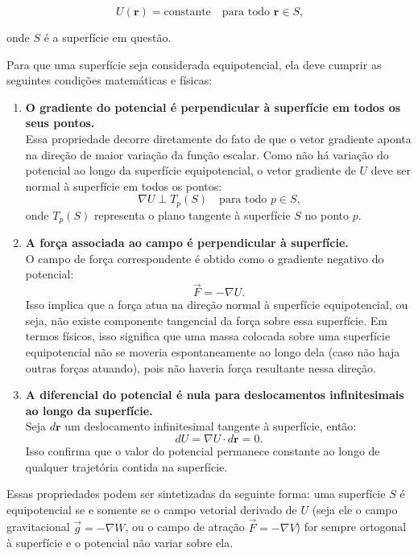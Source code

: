\[
U(\mathbf{r}) = \text{constante} \quad \text{para todo } \mathbf{r} \in S \text{,}
\]

\noindent
onde \( S \) é a superfície em questão.

Para que uma superfície seja considerada equipotencial, ela deve cumprir as seguintes condições matemáticas e físicas:

\begin{enumerate}
   \item \textbf{O gradiente do potencial é perpendicular à superfície em todos os seus pontos.} \\
   Essa propriedade decorre diretamente do fato de que o vetor gradiente aponta na direção de maior variação da função escalar. Como não há variação do potencial ao longo da superfície equipotencial, o vetor gradiente de \( U \) deve ser normal à superfície em todos os pontos:
   \[
   \nabla U \perp T_p(S) \quad \text{para todo } p \in S \text{,}
   \]
   onde \( T_p(S) \) representa o plano tangente à superfície \( S \) no ponto \( p \).

   \item \textbf{A força associada ao campo é perpendicular à superfície.} \\
   O campo de força correspondente é obtido como o gradiente negativo do potencial:
   \[
   \vec{F} = -\nabla U \text{.}
   \]
   Isso implica que a força atua na direção normal à superfície equipotencial, ou seja, não existe componente tangencial da força sobre essa superfície. Em termos físicos, isso significa que uma massa colocada sobre uma superfície equipotencial não se moveria espontaneamente ao longo dela (caso não haja outras forças atuando), pois não haveria força resultante nessa direção.

   \item \textbf{A diferencial do potencial é nula para deslocamentos infinitesimais ao longo da superfície.} \\
   Seja \( d\mathbf{r} \) um deslocamento infinitesimal tangente à superfície, então:
   \[
   dU = \nabla U \cdot d\mathbf{r} = 0 \text{.}
   \]
   Isso confirma que o valor do potencial permanece constante ao longo de qualquer trajetória contida na superfície.
\end{enumerate}


Essas propriedades podem ser sintetizadas da seguinte forma: uma superfície \( S \) é equipotencial se e somente se o campo vetorial derivado de \( U \) (seja ele o campo gravitacional \( \vec{g} = -\nabla W \), ou o campo de atração \( \vec{F} = -\nabla V \)) for sempre ortogonal à superfície e o potencial não variar sobre ela.

